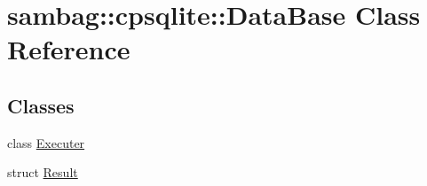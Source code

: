 \hypertarget{classsambag_1_1cpsqlite_1_1_data_base}{
\section{sambag::cpsqlite::DataBase Class Reference}
\label{classsambag_1_1cpsqlite_1_1_data_base}
}
\subsection*{Classes}
\begin{DoxyCompactItemize}
\item 
class \hyperlink{classsambag_1_1cpsqlite_1_1_data_base_1_1_executer}{Executer}
\item 
struct \hyperlink{structsambag_1_1cpsqlite_1_1_data_base_1_1_result}{Result}
\end{DoxyCompactItemize}
